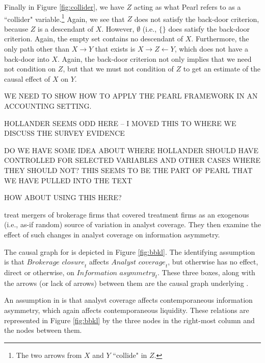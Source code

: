 \documentclass[11pt]{amsart}
\begin{document}
Finally in Figure \ref{fig:collider}, we have $Z$ acting as what Pearl refers to as a ``collider" variable.\footnote{
The two arrows from $X$ and $Y$ ``collide" in $Z$.} %
Again, we see that $Z$ does not satisfy the back-door criterion, because $Z$ is a descendant of $X$.
However, $\emptyset$ (i.e., $\{\}$ does satisfy the back-door criterion.
Again, the empty set contains no descendant of $X$.
Furthermore, the only path other than $X \rightarrow Y$ that exists is $X \rightarrow Z \leftarrow Y$, which does not have a back-door into $X$.
Again, the back-door criterion not only implies that we need not condition on $Z$, but that we must not condition of $Z$ to get an estimate of the causal effect of $X$ on $Y$.

 

WE NEED TO SHOW HOW TO APPLY THE PEARL FRAMEWORK IN AN ACCOUNTING SETTING.

HOLLANDER SEEMS ODD HERE -- I MOVED THIS TO WHERE WE DISCUSS THE SURVEY EVIDENCE

DO WE HAVE SOME IDEA ABOUT WHERE HOLLANDER SHOULD HAVE CONTROLLED FOR SELECTED VARIABLES AND OTHER CASES WHERE THEY SHOULD NOT?  THIS SEEMS TO BE THE PART OF PEARL THAT WE HAVE PULLED INTO THE TEXT

HOW ABOUT USING THIS HERE?

\citet{Kelly:2012ih} treat mergers of brokerage firms that covered treatment firms as an exogenous (i.e., as-if random) source of variation in analyst coverage.%
They then examine the effect of such changes in analyst coverage on information asymmetry.

The causal graph for \citet{Kelly:2012ih} is depicted in Figure \ref{fig:bbkl}.
The identifying assumption is that $\textit{Brokerage closure}_t$ affects $\textit{Analyst coverage}_t$, but otherwise has no effect, direct or otherwise, on $\textit{Information asymmetry}_t$.
These three boxes, along with the arrows (or lack of arrows) between them are the causal graph underlying \citet{Kelly:2012ih}.

An assumption in \citet{Kelly:2012ih} is that analyst coverage affects contemporaneous information asymmetry, which again affects contemporaneous liquidity.
These relations are represented in Figure \ref{fig:bbkl} by the three nodes in the right-most column and the nodes between them.
\end{document}
